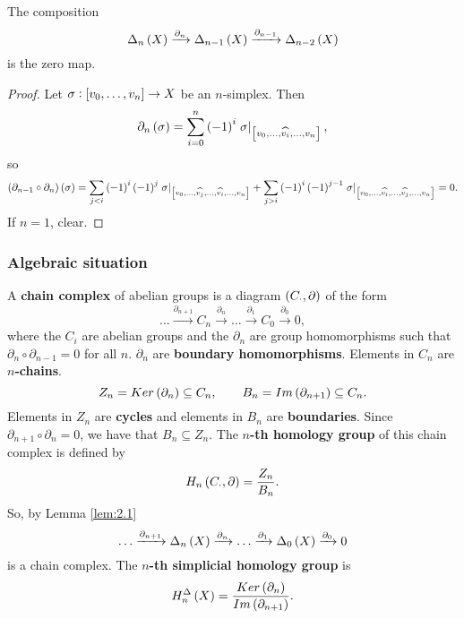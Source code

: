 \begin{lemma}
\label{lem:2.1}
The composition
$$ \Delta_n\br{X} \xrightarrow{\partial_n} \Delta_{n - 1}\br{X} \xrightarrow{\partial_{n - 1}} \Delta_{n - 2}\br{X} $$
is the zero map.
\end{lemma}

\begin{proof}
Let $ \sigma : \sbr{v_0, \dots, v_n} \to X $ be an $ n $-simplex. Then
$$ \partial_n\br{\sigma} = \sum_{i = 0}^n \br{-1}^i\eval{\sigma}_{\sbr{v_0, \dots, \widehat{v_i}, \dots, v_n}}, $$
so
$$ \br{\partial_{n - 1} \circ \partial_n}\br{\sigma} = \sum_{j < i} \br{-1}^i\br{-1}^j\eval{\sigma}_{\sbr{v_0, \dots, \widehat{v_j}, \dots, \widehat{v_i}, \dots, v_n}} + \sum_{j > i} \br{-1}^i\br{-1}^{j - 1}\eval{\sigma}_{\sbr{v_0, \dots, \widehat{v_i}, \dots, \widehat{v_j}, \dots, v_n}} = 0. $$
If $ n = 1 $, clear.
\end{proof}

\pagebreak

\subsubsection{Algebraic situation}

A \textbf{chain complex} of abelian groups is a diagram $ \br{C_\cdot, \partial} $ of the form
$$ \dots \xrightarrow{\partial_{n + 1}} C_n \xrightarrow{\partial_n} \dots \xrightarrow{\partial_1} C_0 \xrightarrow{\partial_0} 0, $$
where the $ C_i $ are abelian groups and the $ \partial_n $ are group homomorphisms such that $ \partial_n \circ \partial_{n - 1} = 0 $ for all $ n $. $ \partial_n $ are \textbf{boundary homomorphisms}. Elements in $ C_n $ are \textbf{$ n $-chains}.
$$ Z_n = Ker\br{\partial_n} \subseteq C_n, \qquad B_n = Im\br{\partial_{n + 1}} \subseteq C_n. $$
Elements in $ Z_n $ are \textbf{cycles} and elements in $ B_n $ are \textbf{boundaries}. Since $ \partial_{n + 1} \circ \partial_n = 0 $, we have that $ B_n \subseteq Z_n $. The \textbf{$ n $-th homology group} of this chain complex is defined by
$$ H_n\br{C_\cdot, \partial} = \dfrac{Z_n}{B_n}. $$
So, by Lemma \ref{lem:2.1}
$$ \dots \xrightarrow{\partial_{n + 1}} \Delta_n\br{X} \xrightarrow{\partial_n} \dots \xrightarrow{\partial_1} \Delta_0\br{X} \xrightarrow{\partial_0} 0 $$
is a chain complex. The \textbf{$ n $-th simplicial homology group} is
$$ H_n^\Delta\br{X} = \dfrac{Ker\br{\partial_n}}{Im\br{\partial_{n + 1}}}. $$

